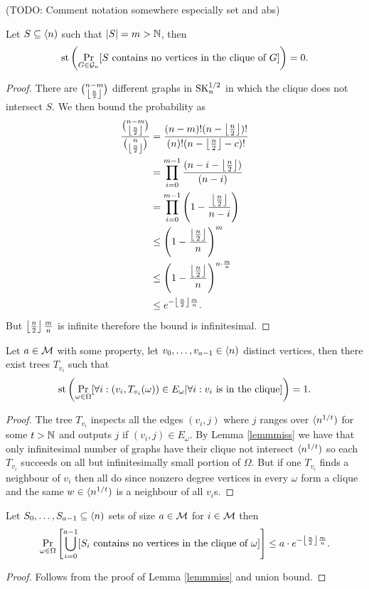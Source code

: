 (TODO: Comment notation somewhere especially set and abs)
\begin{lemm}\label{lemmmiss}
Let $S\subseteq \langle n)$ such that $\left|{S}\right|=m > \mathbb{N}$, then
\[\text{st}\left(\Pr_{G\in\mathcal{G}_n}[\text{$S$ contains no vertices in the clique of $G$}]\right)=0.\]
\end{lemm}
\begin{proof}
There are $\binom{n-m}{\left \lfloor {\frac{n}{2}} \right \rfloor}$ different graphs in $\text{SK}_n^{1/2}$ in which the clique does not intersect $S$. We then bound the probability as
\begin{align}
\frac{\binom{n-m}{\left \lfloor {\frac{n}{2}} \right \rfloor}}{\binom{n}{\left \lfloor {\frac{n}{2}} \right \rfloor}}&=\frac{(n-m)!(n-\left \lfloor {\frac{n}{2}} \right \rfloor)!}{(n)!(n-\left \lfloor {\frac{n}{2}} \right \rfloor-c)!}\\
&=\prod_{i=0}^{m-1}\frac{(n-i-\left \lfloor {\frac{n}{2}} \right \rfloor)}{(n-i)}\\
&=\prod_{i=0}^{m-1}\left(1-\frac{\left \lfloor {\frac{n}{2}} \right \rfloor}{n-i}\right)\\
&\leq \left(1-\frac{\left \lfloor {\frac{n}{2}} \right \rfloor}{n}\right)^m\\
&\leq \left(1-\frac{\left \lfloor {\frac{n}{2}} \right \rfloor}{n}\right)^{n \cdot \frac{m}{n}}\\
&\leq e^{-\left \lfloor {\frac{n}{2}} \right \rfloor\frac{m}{n}}.
\end{align}
But $\left \lfloor {\frac{n}{2}} \right \rfloor \frac{m}{n}$ is infinite therefore the bound is infinitesimal.
\end{proof}

\begin{lemm}\label{lemmfindtree}
Let $a\in\mathcal{M}$ with some property, let $v_0,\dots,v_{a-1}\in \langle n)$ distinct vertices, then there exist trees $T_{v_i}$ such that
\[\text{st}\left(\Pr_{\omega\in\Omega}[\forall i: (v_i,T_{v_i}(\omega))\in E_\omega|\forall i: \text{$v_i$ is in the clique}]\right)=1.\]
\end{lemm}

\begin{proof}
The tree $T_{v_i}$ inspects all the edges $(v_i,j)$ where $j$ ranges over $\langle n^{1/t})$ for some $t>\mathbb{N}$ and outputs $j$ if $(v_i,j)\in E_\omega$. By Lemma \ref{lemmmiss} we have that only infinitesimal number of graphs have their clique not intersect $\langle n^{1/t})$ so each $T_{v_i}$ succeeds on all but infinitesimally small portion of $\Omega$. But if one $T_{v_i}$ finds a neighbour of $v_i$ then all do since nonzero degree vertices in every $\omega$ form a clique and the same $w\in\langle n^{1/t})$ is a neighbour of all $v_i$s.
\end{proof}

\begin{lemm}\label{lemmmiss2}
Let $S_0,\dots,S_{a-1}\subseteq\langle n)$ sets of size $a\in \mathcal{M}$ for $i\in \mathcal{M}$ then
\[\Pr_{\omega\in\Omega}\left[\bigcup_{i=0}^{a-1}[\text{$S_i$ contains no vertices in the clique of $\omega$}]\right]\leq a\cdot e^{-\left \lfloor {\frac{n}{2}} \right \rfloor\frac{m}{n}}.\]
\end{lemm}
\begin{proof}Follows from the proof of Lemma \ref{lemmmiss} and union bound.
\end{proof}

